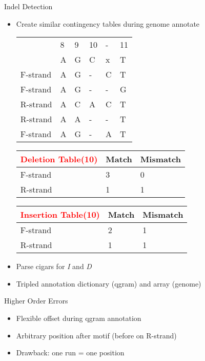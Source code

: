 \documentclass[nenglish]{beamer}
\begin{document}
\begin{frame}[fragile]{Indel Detection}
\begin{itemize}
  \itemsep0.5cm
  \item Create similar contingency tables during genome annotate
\begin{table}[h]
\footnotesize
\hspace*{-0cm}
\begin{tabular}{llllll}
  & 8 & 9 & 10 &- & 11  \\ \cline{1-6}
  & A & G & C&x & T  \\ \cline{1-6}
F-strand & A & G&-   & C  & T   \\
F-strand & A & G  &- & - & G \\
R-strand & A & C &A  & C & T \\
R-strand & A & A &-  & - & T \\
F-strand & A &G & -  & A & T \\ \cline{1-6}
\end{tabular}
\end{table}
\vspace*{0.2cm}
\begin{table}
  \tiny

\begin{tabular}{l|ll}
\textcolor{red}{Deletion Table(10)} &Match & Mismatch   \\ \hline
F-strand   & 3 & 0 \\
R-strand   & 1 & 1 \\ 
\end{tabular}
\quad
\begin{tabular}{l|ll}
\textcolor{red}{Insertion Table(10)} &Match & Mismatch   \\ \hline
F-strand   & 2 & 1 \\
R-strand   & 1 & 1 \\ 
\end{tabular}
\end{table}
\pause
  \item Parse cigars for \emph{I} and \emph{D}
  \item Tripled annotation dictionary (qgram) and array (genome)
\end{itemize}
\end{frame}


\begin{frame}[fragile]{Higher Order Errors}
 \begin{itemize}
  \item Flexible offset during qgram annotation
  \item Arbitrary position after motif (before on R-strand)
  \item Drawback: one run = one position
 \end{itemize}
\end{frame}
\end{document}
